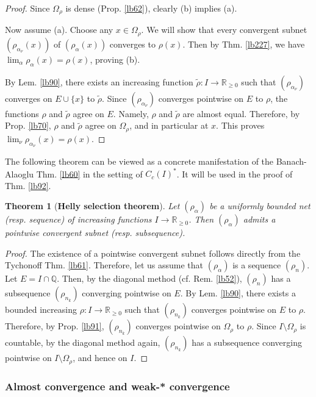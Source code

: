 \documentclass[12pt,b5paper,notitlepage]{article}
\theoremstyle{definition}
\theoremstyle{plain}
\newtheorem{thm}[df]{Theorem}
\newcommand{\wtd}{\widetilde}
\newcommand{\Qbb}{\mathbb Q}
\newcommand{\Rbb}{\mathbb R}
\numberwithin{equation}{section}
\begin{document}
\begin{proof}
Since $\Omega_\rho$ is dense (Prop. \ref{lb62}), clearly (b) implies (a).

Now assume (a). Choose any $x\in\Omega_\rho$. We will show that every convergent subnet $(\rho_{\alpha_\nu}(x))$ of $(\rho_\alpha(x))$ converges to $\rho(x)$. Then by Thm. \ref{lb227}, we have $\lim_\alpha\rho_\alpha(x)=\rho(x)$, proving (b).

By Lem. \ref{lb90},  there exists an increasing function $\wtd\rho:I\rightarrow\Rbb_{\geq0}$ such that $(\rho_{\alpha_\nu})$ converges on $E\cup\{x\}$ to $\wtd\rho$. Since $(\rho_{\alpha_\nu})$ converges pointwise on $E$ to $\rho$, the functions $\rho$ and $\wtd\rho$ agree on $E$. Namely, $\rho$ and $\wtd\rho$ are almost equal. Therefore, by Prop. \ref{lb70}, $\rho$ and $\wtd\rho$ agree on $\Omega_\rho$, and in particular at $x$. This proves $\lim_\nu\rho_{\alpha_\nu}(x)=\rho(x)$.
\end{proof}


The following theorem can be viewed as a concrete manifestation of the Banach-Alaoglu Thm. \ref{lb60} in the setting of $C_c(I)^*$. It will be used in the proof of Thm. \ref{lb92}.


\begin{thm}[\textbf{Helly selection theorem}]\label{lb94}
Let $(\rho_\alpha)$ be a uniformly bounded net (resp. sequence) of increasing functions $I\rightarrow\Rbb_{\geq0}$. Then $(\rho_\alpha)$ admits a pointwise convergent subnet (resp. subsequence).
\end{thm}

\begin{proof}
The existence of a pointwise convergent subnet follows directly from the Tychonoff Thm. \ref{lb61}. Therefore, let us assume that $(\rho_\alpha)$ is a sequence $(\rho_n)$. Let $E=I\cap\Qbb$. Then, by the diagonal method (cf. Rem. \ref{lb52}), $(\rho_n)$ has a subsequence $(\rho_{n_k})$ converging pointwise on $E$. By Lem. \ref{lb90}, there exists a bounded increasing $\rho:I\rightarrow\Rbb_{\geq0}$ such that $(\rho_{n_k})$ converges pointwise on $E$ to $\rho$. Therefore, by Prop. \ref{lb91}, $(\rho_{n_k})$ converges pointwise on $\Omega_\rho$ to $\rho$. Since $I\setminus\Omega_\rho$ is countable, by the diagonal method again, $(\rho_{n_k})$ has a subsequence converging pointwise on $I\setminus\Omega_\rho$, and hence on $I$. 
\end{proof}



\subsubsection{Almost convergence and weak-* convergence}
\end{document}
